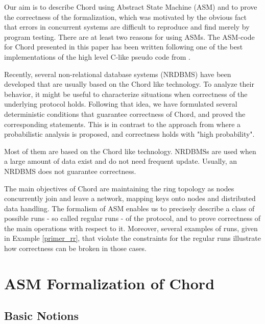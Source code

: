 \documentclass{amsart}
\theoremstyle{definition}
\begin{document}
Our aim is to describe Chord using Abstract State Machine (ASM)
\cite{GUR95} and to prove the correctness of the formalization,
which was motivated by the obvious fact that errors in concurrent
systems are difficult to reproduce and find merely by program
testing. There are at least two reasons for using ASMs. 
The ASM-code for Chord presented in this paper has been written
following one of the best implementations \cite{Bamberg} of the
high level C-like pseudo code from \cite{Chord-IEEE}.


Recently, several non-relational database systems (NRDBMS) have
been developed \cite{LaM10, bigtable} that are usually based on
the Chord like technology. To analyze their behavior, it might be
useful to characterize situations when correctness of the
underlying protocol holds. Following that idea, we have formulated
several deterministic conditions that guarantee correctness of
Chord, and proved the corresponding statements. This is in
contrast to the approach from
\cite{Chord,Chord-TR,Chord-IEEE,liben02} where a probabilistic
analysis is proposed, and correctness holds with "high
probability".

 Most of them are based on the Chord like technology. NRDBMSs are
 used when a large amount of data exist and do not need frequent
 update. Usually, an NRDBMS does not guarantee correctness.
 
The main objectives of Chord are maintaining the ring topology as
nodes concurrently join and leave a network, mapping keys onto
nodes and distributed data handling.
The formalism of ASM enables us to precisely describe a class of
possible runs - so called regular runs - of the protocol, and to
prove correctness of the main operations with respect to it.
Moreover, several examples of runs, given in Example
\ref{primer_rr}, that violate the constraints for the regular runs
illustrate how correctness can be broken in those cases.


\section{ASM Formalization of Chord}
\label{formal_chord}

\subsection{Basic Notions}
\end{document}

